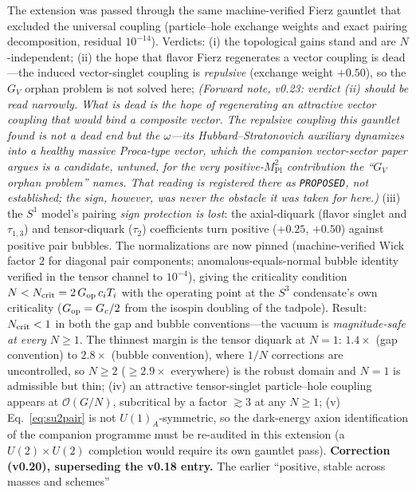 \documentclass[11pt,a4paper]{article}
\begin{document}
The extension was passed through the same machine-verified Fierz
gauntlet that excluded the universal coupling (particle--hole
exchange weights and exact pairing decomposition, residual
$10^{-14}$).  Verdicts:
(i) the topological gains stand and are $N$-independent;
(ii) the hope that flavor Fierz regenerates a vector coupling is
dead---the induced vector-singlet coupling is \emph{repulsive}
(exchange weight $+0.50$), so the $G_V$ orphan problem is not
solved here;
\emph{(Forward note, v0.23: verdict (ii) should be read narrowly.
What is dead is the hope of regenerating an \emph{attractive}
vector coupling that would bind a composite vector.  The repulsive
coupling this gauntlet found is not a dead end but the
$\omega$---its Hubbard--Stratonovich auxiliary dynamizes into a
healthy massive Proca-type vector, which the companion
vector-sector paper argues is a candidate, untuned, for the very
positive-$M_{\mathrm{Pl}}^2$ contribution the ``$G_V$ orphan problem''
names.  That reading is registered there as \texttt{PROPOSED},
not established; the sign, however, was never the obstacle it was
taken for here.)}
(iii) the $S^1$ model's pairing \emph{sign protection is lost}:
the axial-diquark (flavor singlet and $\tau_{1,3}$) and
tensor-diquark ($\tau_2$) coefficients turn positive
($+0.25$, $+0.50$) against positive pair bubbles.  The
normalizations are now pinned (machine-verified Wick factor $2$
for diagonal pair components; anomalous-equals-normal bubble
identity verified in the tensor channel to $10^{-4}$), giving the
criticality condition $N < N_{\rm crit} = 2\,G_{\rm op}\,c_i
T_i$ with the operating point at the $S^3$ condensate's own
criticality ($G_{\rm op} = G_c/2$ from the isospin doubling of
the tadpole).  Result: $N_{\rm crit} < 1$ in both the gap and
bubble conventions---the vacuum is \emph{magnitude-safe at every
$N \geq 1$}.  The thinnest margin is the tensor diquark at
$N = 1$: $1.4\times$ (gap convention) to $2.8\times$ (bubble
convention), where $1/N$ corrections are uncontrolled, so
$N \geq 2$ ($\geq 2.9\times$ everywhere) is the robust domain
and $N = 1$ is admissible but thin;
(iv) an attractive tensor-singlet particle--hole coupling appears
at $\mathcal{O}(G/N)$, subcritical by a factor $\gtrsim 3$ at any
$N \geq 1$;
(v) Eq.~\eqref{eq:su2pair} is not $U(1)_A$-symmetric, so the
dark-energy axion identification of the companion programme must
be re-audited in this extension (a $U(2)\times U(2)$ completion
would require its own gauntlet pass).
\textbf{Correction (v0.20), superseding the v0.18 entry.}  The
earlier ``positive, stable across masses and schemes''
\end{document}
